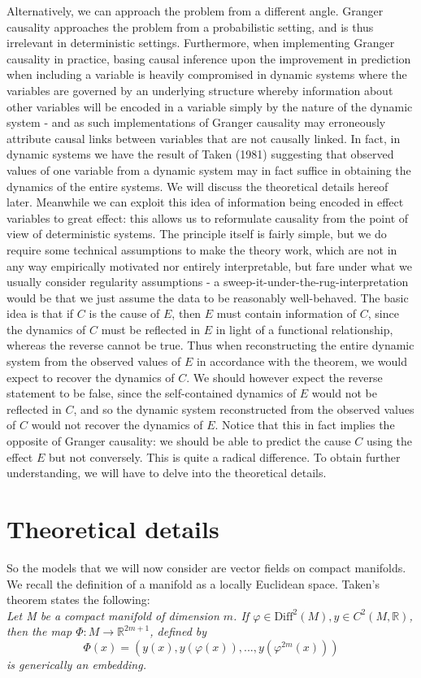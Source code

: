 \documentclass[11pt, a4paper]{memoir}
\begin{document}
Alternatively, we can approach the problem from a different angle. Granger causality approaches the problem from a probabilistic setting, and is thus irrelevant in deterministic settings. Furthermore, when implementing Granger causality in practice, basing causal inference upon the improvement in prediction when including a variable is heavily compromised in dynamic systems where the variables are governed by an underlying structure whereby information about other variables will be encoded in a variable simply by the nature of the dynamic system - and as such implementations of Granger causality may erroneously attribute causal links between variables that are not causally linked. In fact, in dynamic systems we have the result of Taken (1981) suggesting that observed values of one variable from a dynamic system may in fact suffice in obtaining the dynamics of the entire systems. We will discuss the theoretical details hereof later. Meanwhile we can exploit this idea of information being encoded in effect variables to great effect: this allows us to reformulate causality from the point of view of deterministic systems. The principle itself is fairly simple, but we do require some technical assumptions to make the theory work, which are not in any way empirically motivated nor entirely interpretable, but fare under what we usually consider regularity assumptions - a sweep-it-under-the-rug-interpretation would be that we just assume the data to be reasonably well-behaved. The basic idea is that if $C$ is the cause of $E$, then $E$ must contain information of $C$, since the dynamics of $C$ must be reflected in $E$ in light of a functional relationship, whereas the reverse cannot be true. Thus when reconstructing the entire dynamic system from the observed values of $E$ in accordance with the theorem, we would expect to recover the dynamics of $C$. We should however expect the reverse statement to be false, since the self-contained dynamics of $E$ would not be reflected in $C$, and so the dynamic system reconstructed from the observed values of $C$ would not recover the dynamics of $E$. Notice that this in fact implies the opposite of Granger causality: we should be able to predict the cause $C$ using the effect $E$ but not conversely. This is quite a radical difference. To obtain further understanding, we will have to delve into the theoretical details. 
\section{Theoretical details}
So the models that we will now consider are vector fields on compact manifolds. We recall the definition of a manifold as a locally Euclidean space.
Taken's theorem states the following:\\
\textit{Let M be a compact manifold of dimension $m$. If $\varphi\in \text{Diff}^2(M), y\in C^2(M,\mathbb{R})$, then the map $\Phi:M\to \mathbb{R}^{2m+1}$, defined by
$$\Phi(x)=(y(x),y(\varphi(x)),...,y(\varphi^{2m}(x)))$$
is generically an embedding.}
\end{document}

